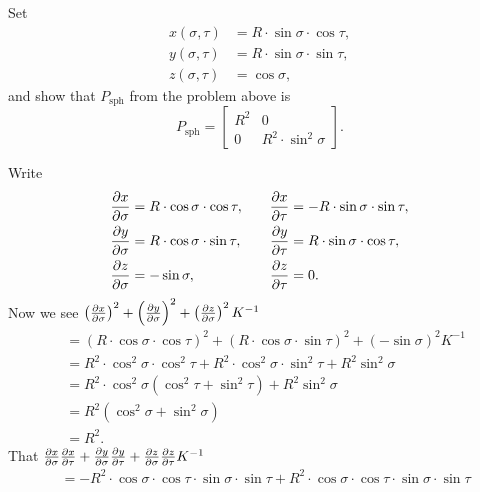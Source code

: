 \documentclass[newpage,hints,handout]{ximera}
\begin{document}
\begin{problem}
  Set
  \begin{align*}
    x(\sigma,\tau) &=R\cdot \sin\sigma\cdot \cos \tau,\\
    y(\sigma,\tau) &=R\cdot \sin\sigma\cdot \sin\tau,\\
    z(\sigma,\tau) &=\cos \sigma,
  \end{align*}
  and show that $P_\mathrm{sph}$ from the problem above is
  \[
  P_\mathrm{sph} =
  \begin{bmatrix}
    R^2 & 0 \\
    0 & R^2\cdot\sin^2 \sigma
  \end{bmatrix}.
  \]
  \begin{freeResponse}
    Write
    \[
    \begin{split}
      \pp[x]{\sigma} &= R\cdot \cos\sigma\cdot \cos \tau, \\
      \pp[y]{\sigma} &= R\cdot \cos\sigma\cdot \sin\tau,\\
      \pp[z]{\sigma} &= -\sin\sigma,
    \end{split}
    \qquad
    \begin{split}
      \pp[x]{\tau} &= -R\cdot \sin\sigma\cdot \sin \tau,\\
      \pp[y]{\tau} &= R\cdot \sin\sigma\cdot \cos\tau,\\
      \pp[z]{\tau} &= 0. 
    \end{split}
    \]
    Now we see $\left(\pp[x]{\sigma}\right)^2 + \left(\pp[y]{\sigma}\right)^2 + \left(\pp[z]{\sigma}\right)^2K^{-1}$
    \begin{align*}
      &= \left(R\cdot \cos\sigma\cdot \cos \tau \right)^2 + \left(R\cdot \cos\sigma\cdot \sin\tau\right)^2 + \left(-\sin\sigma\right)^2K^{-1}\\
      &= R^2\cdot \cos^2\sigma\cdot \cos^2 \tau + R^2\cdot \cos^2\sigma\cdot \sin^2\tau + R^2 \sin^2\sigma \\
      &= R^2\cdot \cos^2\sigma\left(\cos^2 \tau + \sin^2\tau\right) + R^2 \sin^2\sigma \\
      &= R^2\left(\cos^2\sigma + \sin^2\sigma\right) \\
      &= R^2.
    \end{align*}
    That $\pp[x]{\sigma}\pp[x]{\tau} + \pp[y]{\sigma}\pp[y]{\tau} + \pp[z]{\sigma}\pp[z]{\tau} K^{-1}$
    \begin{align*}
      &= -R^2\cdot \cos\sigma\cdot \cos \tau \cdot \sin\sigma\cdot \sin \tau + R^2\cdot \cos\sigma\cdot \cos \tau \cdot \sin\sigma\cdot \sin \tau\\

\end{align*}
\end{freeResponse}
\end{problem}
\end{document}
